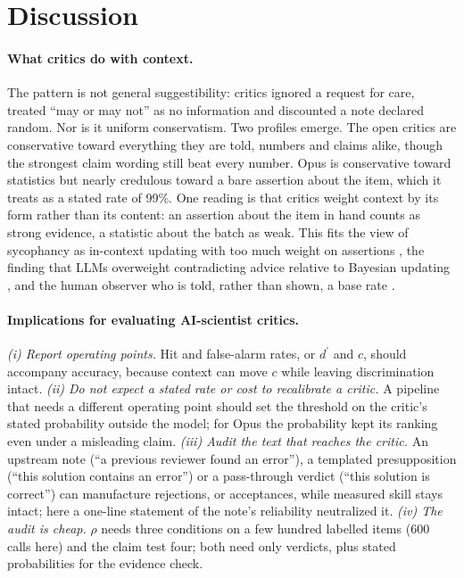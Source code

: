 \documentclass[letterpaper]{article} %
\newcommand{\dprime}{d^{\prime}}
\begin{document}
\section{Discussion}

\paragraph{What critics do with context.} The pattern is not general suggestibility: critics ignored a request for care, treated ``may or may not'' as no information and discounted a note declared random. Nor is it uniform conservatism. Two profiles emerge. The open critics are conservative toward everything they are told, numbers and claims alike, though the strongest claim wording still beat every number. Opus is conservative toward statistics but nearly credulous toward a bare assertion about the item, which it treats as a stated rate of 99\%. One reading is that critics weight context by its form rather than its content: an assertion about the item in hand counts as strong evidence, a statistic about the batch as weak. This fits the view of sycophancy as in-context updating with too much weight on assertions \citep{shapira2026sycophancy}, the finding that LLMs overweight contradicting advice relative to Bayesian updating \citep{kumaran2025overconfidence}, and the human observer who is told, rather than shown, a base rate \citep{estes1995interactions}.

\paragraph{Implications for evaluating AI-scientist critics.} \emph{(i) Report operating points.} Hit and false-alarm rates, or $\dprime$ and $c$, should accompany accuracy, because context can move $c$ while leaving discrimination intact. \emph{(ii) Do not expect a stated rate or cost to recalibrate a critic.} A pipeline that needs a different operating point should set the threshold on the critic's stated probability outside the model; for Opus the probability kept its ranking even under a misleading claim. \emph{(iii) Audit the text that reaches the critic.} An upstream note (``a previous reviewer found an error''), a templated presupposition (``this solution contains an error'') or a pass-through verdict (``this solution is correct'') can manufacture rejections, or acceptances, while measured skill stays intact; here a one-line statement of the note's reliability neutralized it. \emph{(iv) The audit is cheap.} $\rho$ needs three conditions on a few hundred labelled items (600 calls here) and the claim test four; both need only verdicts, plus stated probabilities for the evidence check.
\end{document}
